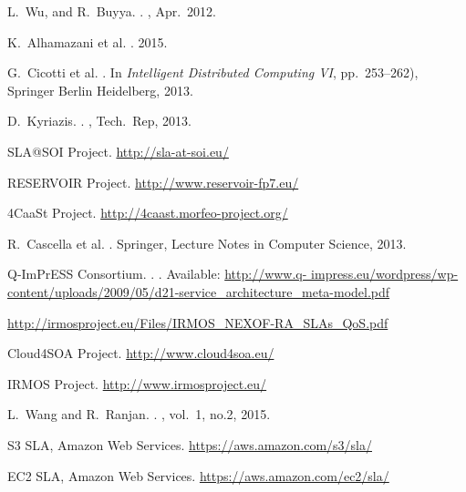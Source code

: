 \begin{thebibliography}{10}
L.~Wu, and R.~Buyya.
.
, Apr.~2012.

K.~Alhamazani et al.
.
2015.

G.~Cicotti et al.
.
\newblock In {\em Intelligent Distributed Computing VI}, pp.~253--262), Springer Berlin Heidelberg, 2013.

D.~Kyriazis.
.
, Tech.~Rep, 2013.

SLA@SOI Project.
\newblock \url{http://sla-at-soi.eu/}

RESERVOIR Project.
\newblock \url{http://www.reservoir-fp7.eu/}

4CaaSt Project.
\newblock \url{http://4caast.morfeo-project.org/}

R.~Cascella et al.
.
Springer, Lecture Notes in Computer Science, 2013.

Q-ImPrESS Consortium.
.
.
Available: \url{http://www.q- impress.eu/wordpress/wp-content/uploads/2009/05/d21-service_architecture_meta-model.pdf}

\newblock \url{http://irmosproject.eu/Files/IRMOS_NEXOF-RA_SLAs_QoS.pdf}

Cloud4SOA Project.
\newblock \url{http://www.cloud4soa.eu/}

IRMOS Project.
\newblock \url{http://www.irmosproject.eu/}

L.~Wang and R.~Ranjan.
.
, vol.~1, no.2, 2015.

S3 SLA, Amazon Web Services.
\newblock \url{https://aws.amazon.com/s3/sla/}

EC2 SLA, Amazon Web Services.
\newblock \url{https://aws.amazon.com/ec2/sla/}

\end{thebibliography}


